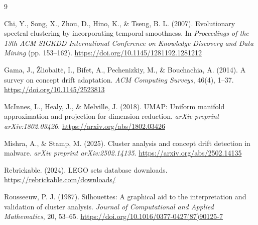 \documentclass[11pt, letterpaper]{article}
\begin{document}
\begin{thebibliography}{9}

Chi, Y., Song, X., Zhou, D., Hino, K., \& Tseng, B. L. (2007).
\newblock Evolutionary spectral clustering by incorporating temporal smoothness.
\newblock In \textit{Proceedings of the 13th ACM SIGKDD International Conference on Knowledge Discovery and Data Mining} (pp. 153--162).
\newblock \url{https://doi.org/10.1145/1281192.1281212}

Gama, J., Žliobaitė, I., Bifet, A., Pechenizkiy, M., \& Bouchachia, A. (2014).
\newblock A survey on concept drift adaptation.
\newblock \textit{ACM Computing Surveys}, 46(4), 1--37.
\newblock \url{https://doi.org/10.1145/2523813}

McInnes, L., Healy, J., \& Melville, J. (2018).
\newblock UMAP: Uniform manifold approximation and projection for dimension reduction.
\newblock \textit{arXiv preprint arXiv:1802.03426}.
\newblock \url{https://arxiv.org/abs/1802.03426}

Mishra, A., \& Stamp, M. (2025).
\newblock Cluster analysis and concept drift detection in malware.
\newblock \textit{arXiv preprint arXiv:2502.14135}.
\newblock \url{https://arxiv.org/abs/2502.14135}

Rebrickable. (2024).
\newblock LEGO sets database downloads.
\newblock \url{https://rebrickable.com/downloads/}

Rousseeuw, P. J. (1987).
\newblock Silhouettes: A graphical aid to the interpretation and validation of cluster analysis.
\newblock \textit{Journal of Computational and Applied Mathematics}, 20, 53--65.
\newblock \url{https://doi.org/10.1016/0377-0427(87)90125-7}

\end{thebibliography}
\end{document}
